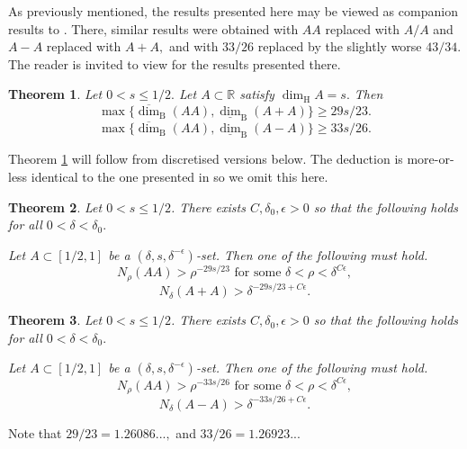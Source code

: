 \documentclass[12pt]{amsart}
\newtheorem{theorem}{Theorem}[section]
\newcommand{\R}{\mathbb{R}}\newcommand{\C}{\mathbb{C}}
\newcommand{\lbox}{\underline\dim_{\mathrm{B}}}
\newcommand{\ubox}{\overline\dim_{\mathrm{B}}}
\newcommand{\1}{\mathbf{1}}
\newcommand{\de}{\delta}
\newcommand{\e}{\epsilon}
\newcommand{\dimh}{\dim_\mathrm{H}}
\newcommand{\cns}[2]{N_{{#1}}({#2})}
\newcommand{\cn}[1]{N_\de({#1})}
\begin{document}
As previously mentioned, the results presented here may be viewed as companion results to \cite[Theorem 1.10 and Theorem 1.11]{doprod}. There, similar results were obtained with $AA$ replaced with $A/A$ and $A-A$ replaced with $A
+A,$ and with $33/26$ replaced by the slightly worse $43/34.$ The reader is invited to view \cite[Subsection 1.4]{doprod} for the results presented there.
		\begin{theorem}\label{thm.sumproddim}
		Let $0 < s \leq 1/2.$ Let $A \subset \R$ satisfy $\dimh A = s.$ Then
        \begin{equation}
			\max\{\ubox{(AA)}, \lbox {(A+A)}\}\geq 29s/23.
		\end{equation}
		\begin{equation}
			\max\{\ubox{(AA)}, \lbox {(A-A)}\}\geq 33s/26.
		\end{equation}
	\end{theorem}
    Theorem \ref{thm.sumproddim} will follow from discretised versions below. The deduction is more-or-less identical to the one presented in \cite{doprod} so we omit this here.
    	\begin{theorem}\label{thm.dissum}
		Let $0 < s \leq 1/2$. There exists $C,\delta_0, \epsilon> 0$ so that the following holds for all $0 < \delta < \delta_0.$
		
		\indent Let $A \subset [1/2,1]$ be a $(\delta, s, \de^{-\e})$-set. Then one of the following must hold.
		\begin{equation}
			\cns{\rho}{AA} > \rho^{-29s/23} \text{ for some } \delta < \rho < \delta^{C\e},
		\end{equation}
		\begin{equation}\label{eq.haus}
			\cn{A+A} > \delta^{-29s/23+ C\e}.
		\end{equation}
	\end{theorem}
	\begin{theorem}\label{thm.dis}
		Let $0 < s \leq 1/2$. There exists $C,\delta_0, \epsilon> 0$ so that the following holds for all $0 < \delta < \delta_0.$
		
		\indent Let $A \subset [1/2,1]$ be a $(\delta, s, \de^{-\e})$-set. Then one of the following must hold.
		\begin{equation}
			\cns{\rho}{AA} > \rho^{-33s/26} \text{ for some } \delta < \rho < \delta^{C\e},
		\end{equation}
		\begin{equation}\label{eq.haus}
			\cn{A-A} > \delta^{-33s/26+C\e}.
		\end{equation}
	\end{theorem}
    Note that $29/23 = 1.26086...,$ and $33/26 = 1.26923...$ 
    
\end{document}
